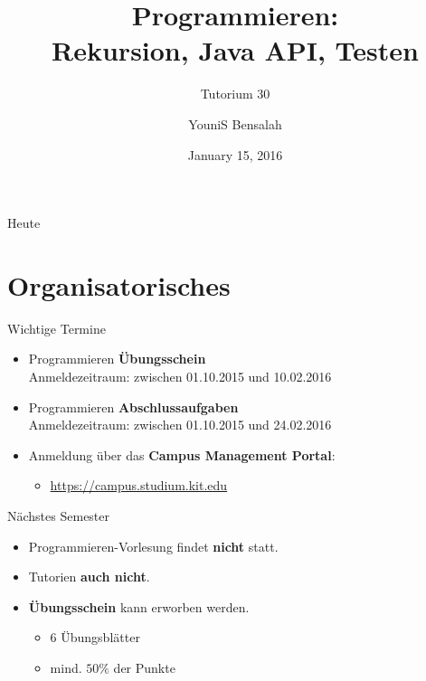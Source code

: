 \documentclass[18pt]{beamer}
\title[Rekursion, Java API, Testen]{Programmieren:\\ Rekursion, Java API, Testen}
\subtitle{Tutorium 30}
\author{YouniS Bensalah}
\date{January 15, 2016}
\institute{Chair for Software Design and Quality}
\begin{document}

\begin{frame}
\titlepage
\end{frame}

\begin{frame}{Heute}
\tableofcontents
\end{frame}

\section{Organisatorisches}

\begin{frame}{Wichtige Termine}
    \begin{itemize}
        \item Programmieren \textbf{Übungsschein}\\
        Anmeldezeitraum: zwischen 01.10.2015 und \alert{10.02.2016}
        \item Programmieren \textbf{Abschlussaufgaben}\\
        Anmeldezeitraum: zwischen 01.10.2015 und \alert{24.02.2016}
    \vspace{.2in}
    \item Anmeldung über das \textbf{Campus Management Portal}:\\
    \begin{itemize}
        \item \url{https://campus.studium.kit.edu}
    \end{itemize}
    \end{itemize}
\end{frame}


\begin{frame}{Nächstes Semester}
    \begin{itemize}
        \item Programmieren-Vorlesung findet \textbf{nicht} statt.
        \item Tutorien \textbf{auch nicht}.
        \item \textbf{Übungsschein} kann erworben werden.
        \begin{itemize}
            \item 6 Übungsblätter
            \item mind. $50\%$ der Punkte
        \end{itemize}
    \end{itemize}
\end{frame}
\end{document}
